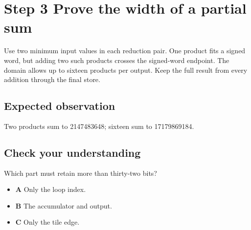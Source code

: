 \section{Step 3 Prove the width of a partial sum}\label{matmul-s03}

Use two minimum input values in each reduction pair. One product fits a signed word, but adding two such products crosses the signed-word endpoint. The domain allows up to sixteen products per output. Keep the full result from every addition through the final store.

\subsection{Expected observation}
Two products sum to 2147483648; sixteen sum to 17179869184.

\subsection{Check your understanding}
Which part must retain more than thirty-two bits?

\begin{itemize}
  \item \textbf{A} Only the loop index.
  \item \textbf{B} The accumulator and output.
  \item \textbf{C} Only the tile edge.
\end{itemize}
